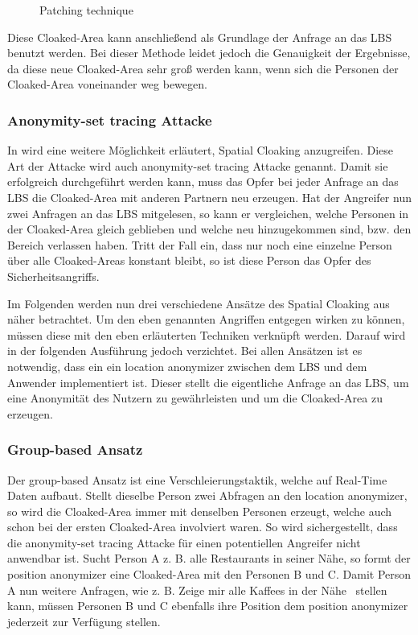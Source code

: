 \begin{itemize}
\begin{figure}[!h]
		\caption{Patching technique}
		\label{fig_chow2011_patching-tech}
\end{figure}
Diese Cloaked-Area kann anschließend als Grundlage der Anfrage an das LBS benutzt werden. Bei dieser Methode leidet jedoch die Genauigkeit der Ergebnisse, da diese neue Cloaked-Area sehr groß werden kann, wenn sich die Personen der Cloaked-Area voneinander weg bewegen.  
\end{itemize} 
\subsubsection{Anonymity-set tracing Attacke} 
In \cite{chow2007} wird eine weitere Möglichkeit erläutert, Spatial Cloaking anzugreifen. Diese Art der Attacke wird auch anonymity-set tracing Attacke genannt. Damit sie erfolgreich durchgeführt werden kann, muss das Opfer bei jeder Anfrage an das LBS die Cloaked-Area mit anderen Partnern neu erzeugen. Hat der Angreifer nun zwei Anfragen an das LBS mitgelesen, so kann er vergleichen, welche Personen in der Cloaked-Area gleich geblieben und welche neu hinzugekommen sind, bzw. den Bereich verlassen haben. Tritt der Fall ein, dass nur noch eine einzelne Person über alle Cloaked-Areas konstant bleibt, so ist diese Person das Opfer des Sicherheitsangriffs.

Im Folgenden werden nun drei verschiedene Ansätze des Spatial Cloaking aus \cite{Chow2011} näher betrachtet. Um den eben genannten Angriffen entgegen wirken zu können, müssen diese mit den eben erläuterten Techniken verknüpft werden. Darauf wird in der folgenden Ausführung jedoch verzichtet. Bei allen Ansätzen ist es notwendig, dass ein ein location anonymizer zwischen dem LBS und dem Anwender implementiert ist. Dieser stellt die eigentliche Anfrage an das LBS, um eine Anonymität des Nutzern zu gewährleisten und um die Cloaked-Area zu erzeugen. 
\subsubsection{Group-based Ansatz} 
Der group-based Ansatz ist eine Verschleierungstaktik, welche auf Real-Time Daten aufbaut. Stellt dieselbe Person zwei Abfragen an den location anonymizer, so wird die Cloaked-Area immer mit denselben Personen erzeugt, welche auch schon bei der ersten Cloaked-Area involviert waren. So wird sichergestellt, dass die anonymity-set tracing Attacke für einen potentiellen Angreifer nicht anwendbar ist. Sucht Person A z. B. alle Restaurants in seiner Nähe, so formt der position anonymizer eine Cloaked-Area mit den Personen B und C. Damit Person A nun weitere Anfragen, wie z. B. \glqq Zeige mir alle Kaffees in der Nähe\grqq~ stellen kann, müssen Personen B und C ebenfalls ihre Position dem position anonymizer jederzeit zur Verfügung stellen. 

